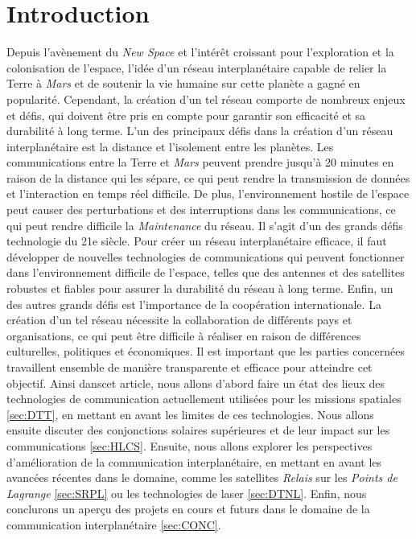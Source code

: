\documentclass[conference]{IEEEtran}
\begin{document}
\section{Introduction}
Depuis l'avènement du \emph{New Space} et l'intérêt croissant pour l'exploration et la colonisation de l'espace, l'idée d'un réseau interplanétaire capable de relier la Terre à \emph{Mars} et de soutenir la vie humaine sur cette planète a gagné en popularité. Cependant, la création d'un tel réseau comporte de nombreux enjeux et défis, qui doivent être pris en compte pour garantir son efficacité et sa durabilité à long terme.
L'un des principaux défis dans la création d'un réseau interplanétaire est la distance et l'isolement entre les planètes. Les communications entre la Terre et \emph{Mars} peuvent prendre jusqu'à 20 minutes en raison de la distance qui les sépare, ce qui peut rendre la transmission de données et l'interaction en temps réel difficile. De plus, l'environnement hostile de l'espace peut causer des perturbations et des interruptions dans les communications, ce qui peut rendre difficile la \emph{Maintenance} du réseau.
Il s'agit d'un des grands défis technologie du 21e siècle. Pour créer un réseau interplanétaire efficace, il faut développer de nouvelles technologies de communications qui peuvent fonctionner dans l'environnement difficile de l'espace, telles que des antennes et des satellites robustes et fiables pour assurer la durabilité du réseau à long terme.
Enfin, un des autres grands défis est l'importance de la coopération internationale. La création d'un tel réseau nécessite la collaboration de différents pays et organisations, ce qui peut être difficile à réaliser en raison de différences culturelles, politiques et économiques. Il est important que les parties concernées travaillent ensemble de manière transparente et efficace pour atteindre cet objectif.
Ainsi danscet article, nous allons d'abord faire un état des lieux des technologies de communication actuellement utilisées pour les missions spatiales \autoref{sec:DTT}, en mettant en avant les limites de ces technologies. Nous allons ensuite discuter des conjonctions solaires supérieures et de leur impact sur les communications \autoref{sec:HLCS}. Ensuite, nous allons explorer les perspectives d'amélioration de la communication interplanétaire, en mettant en avant les avancées récentes dans le domaine, comme les satellites \emph{Relais} sur les \emph{Points de Lagrange} \autoref{sec:SRPL} ou les technologies de laser \autoref{sec:DTNL}. Enfin, nous conclurons un aperçu des projets en cours et futurs dans le domaine de la communication interplanétaire \autoref{sec:CONC}.
\end{document}
